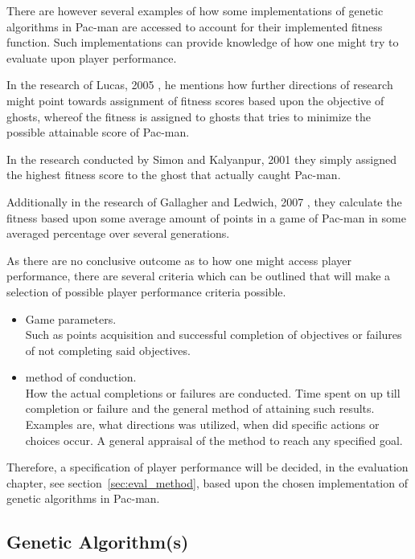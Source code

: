 There are however several examples of how some implementations of genetic algorithms in Pac-man are accessed to account for their implemented fitness function. Such implementations can provide knowledge of how one might try to evaluate upon player performance.

In the research of Lucas, 2005 \cite{Lucas2005}, he mentions how further directions of research might point towards assignment of fitness scores based upon the objective of ghosts, whereof the fitness is assigned to ghosts that tries to minimize the possible attainable score of Pac-man.

In the research conducted by Simon and Kalyanpur, 2001 \cite{Kalyanpur2001} they simply assigned the highest fitness score to the ghost that actually caught Pac-man.

Additionally in the research of Gallagher and Ledwich, 2007 \cite{Gallagher2007}, they calculate the fitness based upon some average amount of points in a game of Pac-man in some averaged percentage over several generations.

As there are no conclusive outcome as to how one might access player performance, there are several criteria which can be outlined that will make a selection of possible player performance criteria possible.

\begin{itemize}
\item Game parameters.\\
Such as points acquisition and successful completion of objectives or failures of not completing said objectives.
\item method of conduction.\\
How the actual completions or failures are conducted. Time spent on up till completion or failure and the general method of attaining such results. Examples are, what directions was utilized, when did specific actions or choices occur. A general appraisal of the method to reach any specified goal.
\end{itemize}

Therefore, a specification of player performance will be decided, in the evaluation chapter, see section~\ref{sec:eval_method}, based upon the chosen implementation of genetic algorithms in Pac-man.


\subsection{Genetic Algorithm(s)}\label{ssec:ga}

